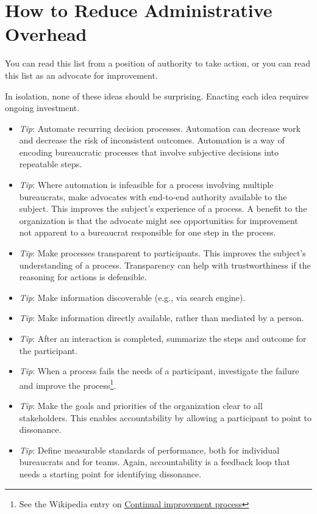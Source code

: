 \section{How to Reduce Administrative Overhead\label{sec:reducing-overhead}}

You can read this list from a position of authority to take action, or you can read this list as an advocate for improvement. 

In isolation, none of these ideas should be surprising. Enacting each idea requires ongoing investment. 
\begin{itemize}
    \item \textit{Tip}: Automate recurring decision processes. Automation can decrease work and decrease the risk of inconsistent outcomes. Automation is a way of encoding bureaucratic processes that involve subjective decisions into repeatable steps.
\item \textit{Tip}: Where automation is infeasible for a process involving multiple bureaucrats, make advocates with end-to-end authority available to the subject. 
This improves the subject's experience of a process. A benefit to the organization is that the advocate might see opportunities for improvement not apparent to a bureaucrat responsible for one step in the process.
\item \textit{Tip}: Make processes transparent to participants. 
This improves the subject's understanding of a process. Transparency can help with trustworthiness if the reasoning for actions is defensible.
\item \textit{Tip}: Make information discoverable (e.g., via search engine).
\item \textit{Tip}: Make information directly available, rather than mediated by a person. 
\item \textit{Tip}: After an interaction is completed, summarize the steps and outcome for the participant. 
\item \textit{Tip}: When a process fails the needs of a participant, investigate the failure and improve the process\footnote{See the Wikipedia entry on \href{https://en.wikipedia.org/wiki/Continual_improvement_process}{Continual improvement process}}. 
\item \textit{Tip}: Make the goals and priorities of the organization clear to all stakeholders. This enables accountability by allowing a participant to point to dissonance.  
\item \textit{Tip}: Define measurable standards of performance, both for individual bureaucrats and for teams. Again, accountability is a feedback loop that needs a starting point for identifying dissonance.

\end{itemize}
